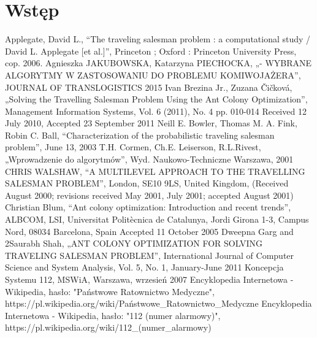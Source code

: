 \documentclass[12pt]{article} %
\begin{document}
\section{Wstęp}



\newpage

\begin{thebibliography}{99}
Applegate, David L., “The traveling salesman problem : a computational study / David L. Applegate [et al.]”, Princeton ; Oxford : Princeton University Press, cop. 2006.
Agnieszka JAKUBOWSKA, Katarzyna PIECHOCKA, „- WYBRANE ALGORYTMY W ZASTOSOWANIU DO PROBLEMU KOMIWOJAŻERA”, JOURNAL OF TRANSLOGISTICS 2015
Ivan Brezina Jr., Zuzana Čičková, „Solving the Travelling Salesman Problem Using the Ant Colony Optimization”, Management Information Systems, Vol. 6 (2011), No. 4 pp. 010-014 Received 12 July 2010, Accepted 23 September 2011
Neill E. Bowler, Thomas M. A. Fink, Robin C. Ball, “Characterization of the probabilistic traveling salesman problem”, June 13, 2003
T.H. Cormen, Ch.E. Leiserson, R.L.Rivest, „Wprowadzenie do algorytmów”, Wyd. Naukowo-Techniczne Warszawa, 2001
CHRIS WALSHAW, “A MULTILEVEL APPROACH TO THE TRAVELLING SALESMAN PROBLEM”, London, SE10 9LS, United Kingdom, (Received August 2000; revisions received May 2001, July 2001; accepted August 2001)
Christian Blum, “Ant colony optimization: Introduction and recent trends”, ALBCOM, LSI, Universitat Politècnica de Catalunya, Jordi Girona 1-3, Campus Nord, 08034 Barcelona, Spain Accepted 11 October 2005
Dweepna Garg and 2Saurabh Shah, „ANT COLONY OPTIMIZATION FOR SOLVING TRAVELING SALESMAN PROBLEM”, International Journal of Computer Science and System Analysis, Vol. 5, No. 1, January-June 2011
Koncepcja Systemu 112, MSWiA, Warszawa, wrzesień 2007
Encyklopedia Internetowa - Wikipedia, hasło: "Państwowe Ratownictwo Medyczne",
https://pl.wikipedia.org/wiki/Państwowe\_Ratownictwo\_Medyczne
Encyklopedia Internetowa - Wikipedia, hasło: "112 (numer alarmowy)",
https://pl.wikipedia.org/wiki/112\_(numer\_alarmowy)




\end{thebibliography}

\end{document}
